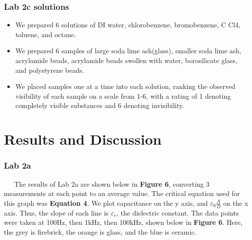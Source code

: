 \documentclass{article}
\begin{document}
\subsubsection*{Lab 2c solutions}
\begin{itemize}
\item We prepared 6 solutions of DI water, chlorobenzene, bromobenzene, C Cl4, toluene, and octane.
\item We prepared 6 samples of large soda lime ash(glass), smaller soda lime ash, acrylamide beads, acrylamide beads swollen with water, borosilicate glass, and polystyrene beads.
\item We placed samples one at a time into each solution, ranking the observed visibility of each sample on a scale from 1-6, with a rating of 1 denoting completely visible substances and 6 denoting invisibility.
\end{itemize}

\section*{Results and Discussion}
\subsubsection*{Lab 2a}
\ \ \ The results of Lab 2a are shown below in \textbf{Figure 6}, converting 3 measurements at each point to an average value. The critical equation used for this graph was \textbf{Equation 4}. We plot capacitance on the y axis, and $\varepsilon_0\frac{A}{D}$ on the x axis. Thus, the slope of each line is $\varepsilon_r$, the dielectric constant. The data points were taken at 100Hz, then 1kHz, then 100kHz, shown below in \textbf{Figure 6}. Here, the grey is firebrick, the orange is glass, and the blue is ceramic.
\end{document}
